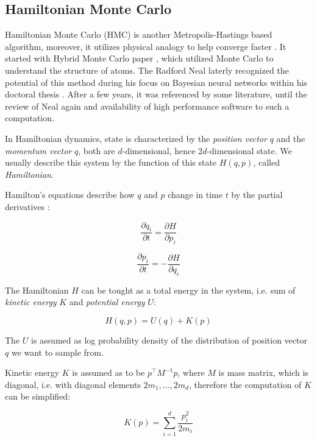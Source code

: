 \documentclass[
  digital, %
  oneside, %
  lof,     %
  lot,     %
]{fithesis4}
\begin{document}
\subsection{Hamiltonian Monte Carlo}

Hamiltonian Monte Carlo (HMC) is another Metropolis-Hastings 
based algorithm, moreover, it utilizes physical analogy to 
help converge faster \cite{betancourt2018}. 
It started with Hybrid Monte Carlo paper \cite{duane1987}, 
which utilized Monte Carlo to understand the structure 
of atoms. 
The Radford Neal laterly recognized the potential of 
this method during his focus on Bayesian neural networks 
within his doctoral thesis \cite{neal1995}. 
After a few years, it was referenced by some literature, 
until the review of Neal again \cite{neal2011} and availability 
of high performance software to such a computation.

In Hamiltonian dynamics, state is characterized by the
\textit{position vector} $q$ and the \textit{momentum vector} $q$,
both are $d$-dimensional, hence $2d$-dimensional state.
We usually describe this system by the function of
this state $H(q, p)$, called \textit{Hamiltonian}.

Hamilton’s equations describe how $q$ and
$p$ change in time $t$ by the partial derivatives \cite{neal2011}:

\begin{equation}
  \frac{\partial q_i}{\partial t} = \frac{\partial H}{\partial p_i}
\end{equation}

\begin{equation}
  \frac{\partial p_i}{\partial t} = - \frac{\partial H}{\partial q_i}
\end{equation}

The Hamiltonian $H$ can be tought as a total energy in the system,
i.e. sum of \textit{kinetic energy} $K$ and \textit{potential energy} $U$:

\begin{equation}
  H(q, p) = U(q) + K(p)
\end{equation}

The $U$ is assumed as log probability density of the distribution
of position vector $q$ we want to sample from.

Kinetic energy $K$ is assumed as to be $p^\intercal M^{-1} p$, 
where $M$ is mass matrix, which is diagonal, i.e. with
diagonal elements $2m_1, ..., 2m_d$, therefore the computation of $K$
can be simplified:

\begin{equation}
  K(p) = \sum_{i=1}^{d} \frac{p_i^2}{2 m_i}
\end{equation}
\end{document}
